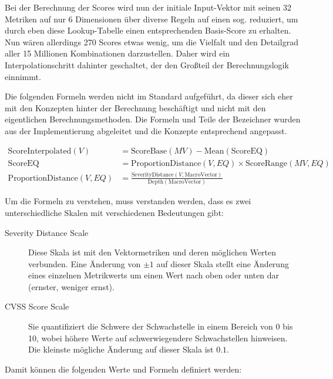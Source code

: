 Bei der Berechnung der Scores wird nun der initiale Input-Vektor mit seinen 32 Metriken auf nur 6 Dimensionen über diverse Regeln auf einen sog.  reduziert, um durch eben diese Lookup-Tabelle einen entsprechenden Basis-Score zu erhalten.
Nun wären allerdings 270 Scores etwas wenig, um die Vielfalt und den Detailgrad aller 15 Millionen Kombinationen darzustellen.
Daher wird ein Interpolationschritt dahinter geschaltet, der den Großteil der Berechnungslogik einnimmt.

Die folgenden Formeln werden nicht im Standard aufgeführt, da dieser sich eher mit den Konzepten hinter der Berechnung beschäftigt und nicht mit den eigentlichen Berechnungsmethoden.
Die Formeln und Teile der Bezeichner wurden aus der Implementierung abgeleitet und die Konzepte entsprechend angepasst.

\begin{align*}
    \text{ScoreInterpolated}(V) &= \text{ScoreBase}(MV) - \text{Mean}(\text{ScoreEQ}) \\
    \text{ScoreEQ} &= \text{ProportionDistance}(V, EQ) \times \text{ScoreRange}(MV, EQ) \\
    \text{ProportionDistance}(V, EQ) &= \frac{\text{SeverityDistance}(V, \text{MacroVector})}{\text{Depth}(\text{MacroVector})}
\end{align*}

Um die Formeln zu verstehen, muss verstanden werden, dass es zwei unterschiedliche Skalen mit verschiedenen Bedeutungen gibt:

\begin{description}
    \item[Severity Distance Scale] Diese Skala ist mit den Vektormetriken und deren möglichen Werten verbunden.
    Eine Änderung von $\pm 1$ auf dieser Skala stellt eine Änderung eines einzelnen Metrikwerts um einen Wert nach oben oder unten dar (ernster, weniger ernst).
    \item[CVSS Score Scale] Sie quantifiziert die Schwere der Schwachstelle in einem Bereich von 0 bis 10, wobei höhere Werte auf schwerwiegendere Schwachstellen hinweisen.
    Die kleinste mögliche Änderung auf dieser Skala ist $0.1$.
\end{description}

Damit können die folgenden Werte und Formeln definiert werden:

